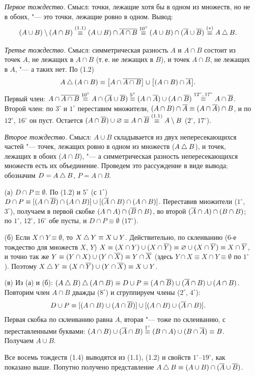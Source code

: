 \begin{solution}[1 (\S\,1)]
\emph{Первое тождество.} Смысл: точки, лежащие хотя бы в одном из
множеств, но не в обоих, "--- это точки, лежащие ровно в одном. Вывод:
\[
(A\cup B)\setminus(A\cap B)\overset{(1.1)}{\equiv}(A\cup B)\cap\overline{A\cap B}
\overset{10^\circ}{\equiv}(A\cup B)\cap(\overline{A}\cup\overline{B})\overset{(*)}{\equiv}A\mathbin{\triangle} B .
\]

\emph{Третье тождество.} Смысл: симметрическая разность $A$ и $A\cap B$
состоит из точек $A$, не лежащих в $A\cap B$ (т.\,е. не лежащих в $B$),
и точек $A\cap B$, не лежащих в $A$, "--- а таких нет. По (1.2)
\[
A\mathbin{\triangle}(A\cap B)\equiv\bigl[A\cap\overline{A\cap B}\bigr]\cup\bigl[(A\cap B)\cap\overline{A}\bigr].
\]
Первый член: $A\cap\overline{A\cap B}\overset{10^\circ}{\equiv}A\cap(\overline{A}\cup\overline{B})
\overset{5^\circ}{\equiv}(A\cap\overline{A})\cup(A\cap\overline{B})
\overset{12^\circ,\,17^\circ}{\equiv}A\cap\overline{B}$. Второй член: по $3^\circ$
и $1^\circ$ переставим множители, $(A\cap B)\cap\overline{A}\equiv(A\cap\overline{A})\cap B$,
и по $12^\circ$, $16^\circ$ он пуст. Остается
$(A\cap\overline{B})\cup\varnothing\equiv A\cap\overline{B}\overset{(1.1)}{\equiv}A\setminus B$
($2^\circ$, $17^\circ$).

\emph{Второе тождество.} Смысл: $A\cup B$ складывается из двух
непересекающихся частей "--- точек, лежащих ровно в одном из множеств
($A\mathbin{\triangle} B$), и точек, лежащих в обоих ($A\cap B$), "--- а симметрическая
разность непересекающихся множеств есть их объединение. Проведем это
рассуждение в виде вывода; обозначим $D=A\mathbin{\triangle} B$, $P=A\cap B$.

(а) $D\cap P\equiv\emptyset$. По (1.2) и $5^\circ$ (с $1^\circ$)
$D\cap P\equiv[(A\cap\overline{B})\cap(A\cap B)]\cup[(\overline{A}\cap B)\cap(A\cap B)]$.
Переставив множители ($1^\circ$, $3^\circ$), получаем в первой скобке
$(A\cap A)\cap(\overline{B}\cap B)$, во второй $(\overline{A}\cap A)\cap(B\cap B)$; по
$1^\circ$, $12^\circ$, $16^\circ$ обе пусты, и $D\cap P\equiv\emptyset$
($17^\circ$).

(б) Если $X\cap Y\equiv\emptyset$, то $X\mathbin{\triangle} Y\equiv X\cup Y$. Действительно,
по склеиванию (6-е тождество для множеств $X$, $Y$)
$X\equiv(X\cap Y)\cup(X\cap\overline{Y})\equiv\varnothing\cup(X\cap\overline{Y})\equiv X\cap\overline{Y}$,
и точно так же $Y\equiv(Y\cap X)\cup(Y\cap\overline{X})\equiv Y\cap\overline{X}$ (здесь
$Y\cap X\equiv X\cap Y\equiv\emptyset$ по $1^\circ$). Поэтому
$X\mathbin{\triangle} Y\equiv(X\cap\overline{Y})\cup(Y\cap\overline{X})\equiv X\cup Y$.

(в) Из (а) и (б):
$(A\mathbin{\triangle} B)\mathbin{\triangle}(A\cap B)\equiv D\cup P\equiv(A\cap\overline{B})\cup(\overline{A}\cap B)\cup(A\cap B)$.
Повторим член $A\cap B$ дважды ($8^\circ$) и сгруппируем члены ($2^\circ$,
$4^\circ$):
\[
D\cup P\equiv[(A\cap B)\cup(A\cap\overline{B})]\cup[(A\cap B)\cup(\overline{A}\cap B)].
\]
Первая скобка по склеиванию равна $A$, вторая "--- тоже по склеиванию,
с переставленными буквами: $(A\cap B)\cup(\overline{A}\cap B)\overset{1^\circ}{\equiv}
(B\cap A)\cup(B\cap\overline{A})\equiv B$. Получаем $A\cup B$.

\answer Все восемь тождеств (1.4) выводятся из (1.1), (1.2) и свойств
$1^\circ$--$19^\circ$, как показано выше. Попутно получено представление
$A\mathbin{\triangle} B\equiv(A\cup B)\cap(\overline{A}\cup\overline{B})$.
\end{solution}


